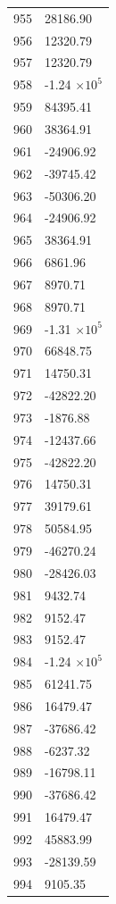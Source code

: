 \documentclass[a4paper,11pt]{article}
\begin{document}
\begin{center}
\begin{longtable}{|R{1.5cm}|R{2.6cm}|}
  955 &     28186.90 \\
  956 &     12320.79 \\
  957 &     12320.79 \\
  958 &        -1.24 $\times 10^{           5}$ \\
  959 &     84395.41 \\
  960 &     38364.91 \\
  961 &    -24906.92 \\
  962 &    -39745.42 \\
  963 &    -50306.20 \\
  964 &    -24906.92 \\
  965 &     38364.91 \\
  966 &      6861.96 \\
  967 &      8970.71 \\
  968 &      8970.71 \\
  969 &        -1.31 $\times 10^{           5}$ \\
  970 &     66848.75 \\
  971 &     14750.31 \\
  972 &    -42822.20 \\
  973 &     -1876.88 \\
  974 &    -12437.66 \\
  975 &    -42822.20 \\
  976 &     14750.31 \\
  977 &     39179.61 \\
  978 &     50584.95 \\
  979 &    -46270.24 \\
  980 &    -28426.03 \\
  981 &      9432.74 \\
  982 &      9152.47 \\
  983 &      9152.47 \\
  984 &        -1.24 $\times 10^{           5}$ \\
  985 &     61241.75 \\
  986 &     16479.47 \\
  987 &    -37686.42 \\
  988 &     -6237.32 \\
  989 &    -16798.11 \\
  990 &    -37686.42 \\
  991 &     16479.47 \\
  992 &     45883.99 \\
  993 &    -28139.59 \\
  994 &      9105.35 \\

\end{longtable}
\end{center}
\end{document}
